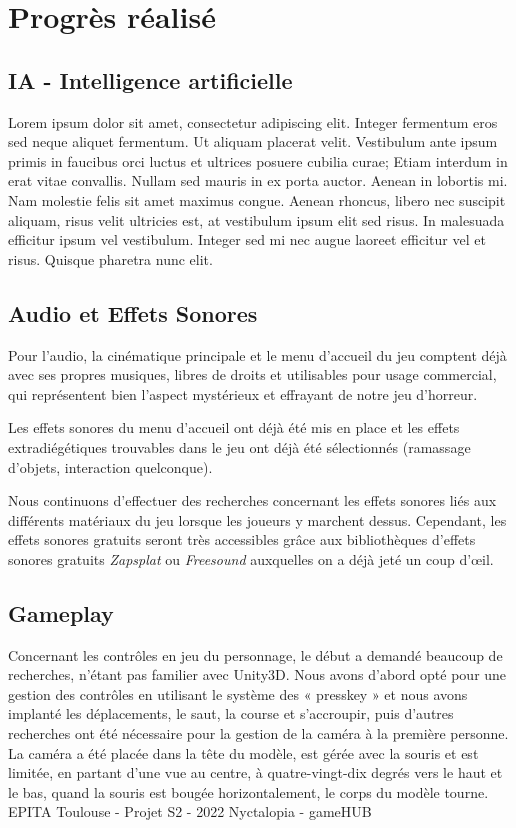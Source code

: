 \section{Progrès réalisé}

\subsection{IA - Intelligence artificielle}
\setlength{\parindent}{5ex}
Lorem ipsum dolor sit amet, consectetur adipiscing elit. Integer fermentum eros sed neque aliquet fermentum. Ut aliquam placerat velit. Vestibulum ante ipsum primis in faucibus orci luctus et ultrices posuere cubilia curae; Etiam interdum in erat vitae convallis. Nullam sed mauris in ex porta auctor. Aenean in lobortis mi. Nam molestie felis sit amet maximus congue. Aenean rhoncus, libero nec suscipit aliquam, risus velit ultricies est, at vestibulum ipsum elit sed risus. In malesuada efficitur ipsum vel vestibulum. Integer sed mi nec augue laoreet efficitur vel et risus. Quisque pharetra nunc elit.

\subsection{Audio et Effets Sonores}
\setlength{\parindent}{5ex}
Pour l’audio, la cinématique principale et le menu d’accueil du jeu comptent déjà avec ses propres musiques, libres de droits et utilisables pour usage commercial, qui représentent bien l’aspect mystérieux et effrayant de notre jeu d’horreur.

Les effets sonores du menu d’accueil ont déjà été mis en place et les effets extradiégétiques trouvables dans le jeu ont déjà été sélectionnés (ramassage d’objets, interaction quelconque).

Nous continuons d’effectuer des recherches concernant les effets sonores liés aux différents matériaux du jeu lorsque les joueurs y marchent dessus. Cependant, les effets sonores gratuits seront très accessibles grâce aux bibliothèques d’effets sonores gratuits \emph{Zapsplat} ou \emph{Freesound} auxquelles on a déjà jeté un coup d’œil. 


\subsection{Gameplay}
\setlength{\parindent}{5ex}
Concernant les contrôles en jeu du personnage, le début a demandé beaucoup de recherches, n’étant pas familier avec Unity3D. Nous avons d’abord opté pour une gestion des contrôles en utilisant le système des « presskey » et nous avons implanté les déplacements, le saut, la course et s'accroupir, puis d’autres recherches ont été nécessaire pour la gestion de la caméra à la première personne. La caméra a été placée dans la tête du modèle, est gérée avec la souris et est limitée, en partant d’une vue au centre, à quatre-vingt-dix degrés vers le haut et le bas, quand la souris est bougée horizontalement, le corps du modèle tourne.
\newline
\vfill
\noindent\makebox[\linewidth]{\rule{.8\paperwidth}{.6pt}}\\[0.2cm]
EPITA Toulouse - Projet S2 - 2022 \hfill Nyctalopia - gameHUB
\noindent\makebox[\linewidth]{\rule{.8\paperwidth}{.6pt}}

